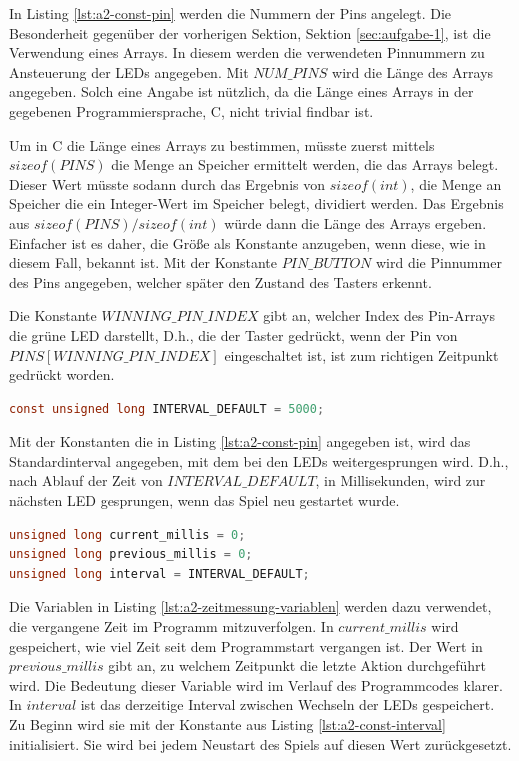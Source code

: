 In Listing \ref{lst:a2-const-pin} werden die Nummern der Pins angelegt.
Die Besonderheit gegenüber der vorherigen Sektion, Sektion \ref{sec:aufgabe-1}, ist die Verwendung eines Arrays.
In diesem werden die verwendeten Pinnummern zu Ansteuerung der LEDs angegeben.
Mit $NUM\_PINS$ wird die Länge des Arrays angegeben.
Solch eine Angabe ist nützlich, da die Länge eines Arrays in der gegebenen Programmiersprache, C, nicht trivial findbar ist.

Um in C die Länge eines Arrays zu bestimmen, müsste zuerst mittels $sizeof(PINS)$ die Menge an Speicher ermittelt werden, die das Arrays belegt.
Dieser Wert müsste sodann durch das Ergebnis von $sizeof(int)$, die Menge an Speicher die ein Integer-Wert im Speicher belegt, dividiert werden.
Das Ergebnis aus $sizeof(PINS) / sizeof(int)$ würde dann die Länge des Arrays ergeben.
Einfacher ist es daher, die Größe als Konstante anzugeben, wenn diese, wie in diesem Fall, bekannt ist.
Mit der Konstante $PIN\_BUTTON$ wird die Pinnummer des Pins angegeben, welcher später den Zustand des Tasters erkennt.

Die Konstante $WINNING\_PIN\_INDEX$ gibt an, welcher Index des Pin-Arrays die grüne LED darstellt,
D.h., die der Taster gedrückt, wenn der Pin von $PINS[WINNING\_PIN\_INDEX]$ eingeschaltet ist, ist zum richtigen Zeitpunkt gedrückt worden.

\begin{lstlisting}[language=C,label={lst:a2-const-interval}, caption={Standard Interval zum LED wechsel}]
const unsigned long INTERVAL_DEFAULT = 5000;
\end{lstlisting}

\newpage

Mit der Konstanten die in Listing \ref{lst:a2-const-pin} angegeben ist, wird das Standardinterval angegeben, mit dem bei den LEDs weitergesprungen wird.
D.h., nach Ablauf der Zeit von $INTERVAL\_DEFAULT$, in Millisekunden, wird zur nächsten LED gesprungen, wenn das Spiel neu gestartet wurde.


\begin{lstlisting}[language=C,label={lst:a2-zeitmessung-variablen}, caption={Variablen zur Zeitmessung}]
unsigned long current_millis = 0;
unsigned long previous_millis = 0;
unsigned long interval = INTERVAL_DEFAULT;
\end{lstlisting}

Die Variablen in Listing \ref{lst:a2-zeitmessung-variablen} werden dazu verwendet, die vergangene Zeit im Programm mitzuverfolgen.
In $current\_millis$ wird gespeichert, wie viel Zeit seit dem Programmstart vergangen ist.
Der Wert in $previous\_millis$ gibt an, zu welchem Zeitpunkt die letzte Aktion durchgeführt wird.
Die Bedeutung dieser Variable wird im Verlauf des Programmcodes klarer.
In $interval$ ist das derzeitige Interval zwischen Wechseln der LEDs gespeichert.
Zu Beginn wird sie mit der Konstante aus Listing \ref{lst:a2-const-interval} initialisiert.
Sie wird bei jedem Neustart des Spiels auf diesen Wert zurückgesetzt.

